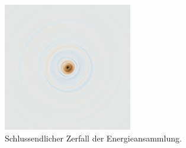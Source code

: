 \begin{figure}
    \begin{center}
        \includegraphics[width=0.5\textwidth]{./papers/particles/figures/simulations/particle_frames/frame_17.png}
        \caption{Schlussendlicher Zerfall der Energieansammlung.\ }\label{particles:fig:partikel:abnehmen:zerfall}
    \end{center}
\end{figure}